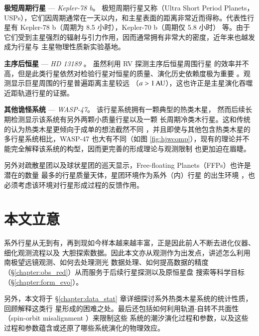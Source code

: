 \textbf{极短周期行星} --- \textit{Kepler-78 b}。  {}  极短周期行星又称（Ultra Short Period Planets，
USPs），它们因周期通常在一天以内，和主星表面的距离非常近而得称。代表性行星有 Kepler-78 
b（周期为 8.5 小时\cite{SanchisOjeda2013}），Kepler-70 b（周期仅 5.8 小时\cite{Charpinet2011}）
等。由于它们受到主星强烈的辐射与引力作用，因而通常拥有非常大的密度，近年来也越发成为行星与
主星物理性质新实验基地\cite{Lopez2016,Moutou2016}。

\textbf{主序后恒星} --- \textit{HD 13189}\cite{Hatzes2005} 。 {}  虽然利用 RV 探测主序后恒星周围行星
的效率并不高\cite{Sato2005}，但是此类行星依然对检验行星对恒星的质量、演化历史依赖度极为重要
\cite{Kennedy2008,Johnson2007b,Jones2014}。观测显示巨星周围的行星普遍距离主星较远
（$a > 1\,\mathrm{AU}$），这也许正是主星演化吞噬近距轨道行星的证据\cite{Johnson2007a,Bowler2010}。

\textbf{其他诡怪系统} --- \textit{WASP-47}。 {}  该行星系统拥有一颗典型的热类木星\cite{Hellier2012}，
然而后续长期检测显示该系统有另外两颗小质量行星\cite{Becker2015,SanchisOjeda2015}以及一颗
长周期冷类木行星\cite{NeveuVanMalle2016}。这和传统的认为热类木星更倾向于成单的想法截然不同
\cite{Steffen2012}，并且即使与其他包含热类木星的多行星系统相比，WASP-47 也大有不同（如图 
\ref{fig:hjwcomp}），现有的理论并不能完全解释该系统的构型，因而更完善的形成理论与观测限制
也更加迫在眉睫。

另外对疏散星团以及球状星团的巡天显示，Free-floating Planets（FFPs）也许是潜在的数量
最多的行星质量天体\cite{Lucas2000,Bihain2009,Sumi2011}，星团环境作为系外（内）行星
的出生环境\cite{Adams2010,Liu2013} ，也必须考虑该环境对行星形成过程的反馈作用。


\section{本文立意}

系外行星从无到有，再到现如今样本越来越丰富，正是因此前人不断去进化仪器、细化观测流程以及
大胆探索数据。因此本文亦从观测作为出发点，讲述怎么利用南极望远镜观测、如何去处理测光
数据处理、如何提高数据的精度（\S \ref{chapter:obs_red}）从而服务于后续行星探测以及原恒星盘
搜索等科学目标（\S \ref{chapter:form_evo}）。

另外，本文将于 \S \ref{chapter:data_stat} 章详细探讨系外热类木星系统的统计性质，回顾解释这类行
星形成的困难之处。最后还包括如何利用轨道-自转不共面性（spin-orbit misalignment ）来限制这些
系统的潮汐演化过程和参数，以及这些过程和参数蕴含或还原了哪些系统演化的物理效应。





